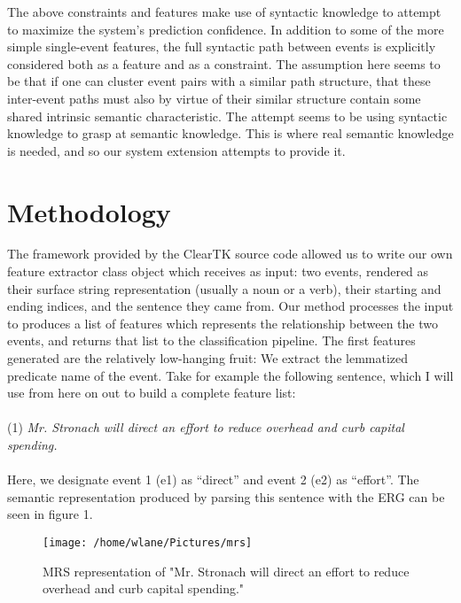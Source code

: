 \documentclass[11pt]{article}
\begin{document}
	\indent The above constraints and features make use of syntactic knowledge to attempt to maximize the system's prediction confidence. In addition to some of the more simple single-event features, the full syntactic path between events is explicitly considered both as a feature and as a constraint. The assumption here seems to be that if one can cluster event pairs with a similar path structure, that these inter-event paths must also by virtue of their similar structure contain some shared intrinsic semantic characteristic. The attempt seems to be using syntactic knowledge to grasp at semantic knowledge. This is where real semantic knowledge is needed, and so our system extension attempts to provide it.
	
\section{Methodology}
The framework provided by the ClearTK source code
allowed us to write our own feature extractor class object which receives as input: two events, rendered
as their surface string representation (usually a noun or a verb), their starting and ending indices, and
the sentence they came from. Our method processes the input to produces a list of features which
represents the relationship between the two events, and returns that list to the classification pipeline.
The first features generated are the relatively low-hanging fruit: We extract the lemmatized
predicate name of the event. Take for example the following sentence, which I will use from here on
out to build a complete feature list:\\\\
(1) \textit{Mr. Stronach will direct an effort to reduce overhead and curb capital spending.}\\\\
Here, we designate event 1 (e1) as “direct” and event 2 (e2) as “effort”. The semantic representation produced by parsing this sentence with the ERG can be seen in figure 1.

\begin{figure*}
	\begin{center}
	\texttt{[image: /home/wlane/Pictures/mrs]}
	\caption{MRS representation of "Mr. Stronach will direct an effort to reduce overhead and curb capital spending."\label{fig:mrs-ex}}
	\end{center}
	\end{figure*}
\end{document}
